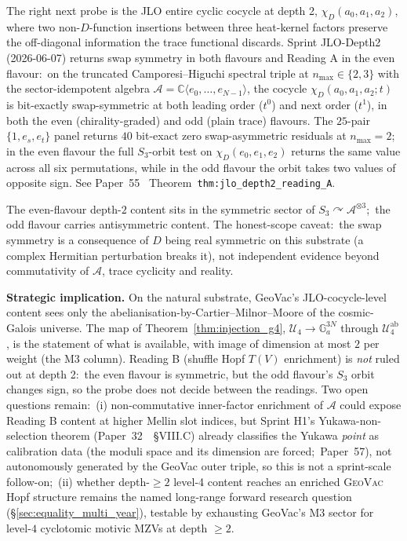 \documentclass[11pt,a4paper]{article}
\theoremstyle{plain}
\theoremstyle{definition}
\newcommand{\Ga}{\mathbb{G}_{a}}
\begin{document}
The right next probe is the JLO entire cyclic cocycle at depth 2,
$\chi_D(a_0, a_1, a_2)$, where two non-$D$-function insertions
between three heat-kernel factors preserve the off-diagonal
information the trace functional discards.  Sprint JLO-Depth2
(2026-06-07) returns swap symmetry in both flavours and Reading A in the
even flavour:\ on the truncated Camporesi--Higuchi
spectral triple at $n_{\max} \in \{2, 3\}$ with the sector-idempotent
algebra $\mathcal{A} = \mathbb{C}\langle e_0, \ldots, e_{N - 1}\rangle$,
the cocycle $\chi_D(a_0, a_1, a_2; t)$ is bit-exactly swap-symmetric at
both leading order ($t^0$) and next order ($t^1$), in both the even
(chirality-graded) and odd (plain trace) flavours.  The $25$-pair $\{1, e_s, e_t\}$ panel
returns $40$ bit-exact zero swap-asymmetric residuals at $n_{\max} = 2$;
in the even flavour the full $S_3$-orbit test on $\chi_D(e_0, e_1, e_2)$
returns the same value across all six permutations, while in the odd
flavour the orbit takes two values of opposite sign.  See
Paper~55~\cite{paper55}
Theorem~\texttt{thm:jlo\_depth2\_reading\_A}.

The even-flavour depth-$2$ content sits in the symmetric sector of
$S_3 \curvearrowright \mathcal{A}^{\otimes 3}$;\ the odd flavour carries
antisymmetric content.  The honest-scope caveat:\ the swap symmetry is a
consequence of $D$ being real symmetric on this substrate (a complex
Hermitian perturbation breaks it), not independent evidence beyond
commutativity of $\mathcal{A}$, trace cyclicity and reality.

\textbf{Strategic implication.}  On the natural substrate, GeoVac's
JLO-cocycle-level content sees only the
abelianisation-by-Cartier--Milnor--Moore of the cosmic-Galois universe.
The map of Theorem~\ref{thm:injection_g4},
$\mathcal{U}_4 \to \Ga^{3N}$ through $\mathcal{U}_4^{\mathrm{ab}}$, is the
statement of what is available, with image of dimension at most $2$ per
weight (the M3 column).  Reading B (shuffle Hopf $T(V)$ enrichment) is
\emph{not} ruled out at depth 2:\ the even flavour is symmetric, but the
odd flavour's $S_3$ orbit changes sign, so the probe does not decide
between the readings.  Two open questions
remain:\ (i) non-commutative inner-factor enrichment of $\mathcal{A}$
could expose Reading B content at higher Mellin slot indices, but
Sprint H1's Yukawa-non-selection theorem
(Paper~32~\cite{paper32}~\S{}VIII.C) already classifies the Yukawa
\emph{point} as calibration data (the moduli space and its dimension are
forced;\ Paper~57), not autonomously generated by the GeoVac outer
triple, so this is not
a sprint-scale follow-on;\ (ii) whether depth-$\ge 2$ level-4 content
reaches an enriched \textsc{GeoVac} Hopf structure remains
the named long-range forward research question (\S\ref{sec:equality_multi_year}),
testable by exhausting GeoVac's M3 sector for level-$4$ cyclotomic
motivic MZVs at depth $\ge 2$.
\end{document}
